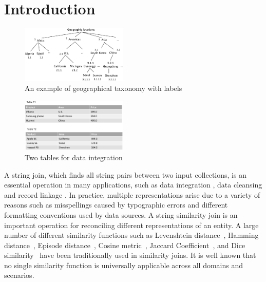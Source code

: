 \section{Introduction}

\begin{figure}[t]
\centering
\includegraphics[width=0.45\textwidth]{figures/taxonomylabels}
 \caption{An example of geographical taxonomy with labels}
\label{fig:taxonomyexample}
\end{figure}


\begin{figure}[t]
\centering
\includegraphics[width=0.45\textwidth]{figures/productexample}
 \caption{Two tables for data integration}
\label{fig:twotables}
\end{figure}


A string join, which finds all string pairs between two input collections, is an essential operation in many applications, such as  data integration \cite{conf/sigmod/Sarawagi04}, data cleansing \cite{conf/vldb/ArasuGK06,journals/www/LiJM06} and record linkage \cite{books/Winkler99}. In practice,  multiple representations
arise due to a variety of reasons such as misspellings
caused by typographic errors and different formatting conventions
used by data sources.  A string similarity join is an important operation for reconciling different
representations of an entity. A large number of different similarity functions such as Levenshtein distance~\cite{conf/sigmod/WangLF12},
Hamming distance~\cite{conf/spire/Kondrak05}, Episode
distance~\cite{conf/ijcai/CohenRF03}, Cosine
metric~\cite{journals/ipm/SaltonB88}, Jaccard
Coefficient~\cite{conf/icde/ChaudhuriGK06,conf/icde/LiLL08}, and Dice
similarity~\cite{conf/www/BayardoMS07} have been traditionally used in similarity joins. It is well known
that no single similarity function is universally applicable
across all domains and scenarios.

